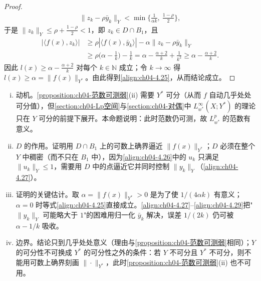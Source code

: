 \documentclass[../../main.tex]{subfiles}%
\begin{document}
\begin{proof}
\begin{align*}
\|z_k-\rho\bar y_k\|_Y<\min\Big\{\frac1{\alpha k},\ \frac{1-\rho}{2}\Big\},
\end{align*}
于是 $\|z_k\|_Y\leqslant\rho+\frac{1-\rho}{2}<1$，即 $z_k\in D\cap B_1$，且
\begin{align*}
|\langle f(x),z_k\rangle|&\geqslant\rho|\langle f(x),\bar y_k\rangle|-\alpha\|z_k-\rho\bar y_k\|_Y\\
&\geqslant\rho\Big(\alpha-\frac1k\Big)-\frac1k=\alpha-\frac{\alpha+2}{k}+\frac1{k^2}\geqslant\alpha-\frac{\alpha+2}{k}.
\end{align*}
因此 $l(x)\geqslant\alpha-\frac{\alpha+2}{k}$ 对每个 $k\in\mathbb{N}$ 成立；令 $k\to\infty$ 得 $l(x)\geqslant\alpha=\|f(x)\|_{Y^*}$。由此得到\eqref{align:ch04-4.25}，从而结论成立。
\end{proof}

\begin{remark}\label{remark:ch04-弱星范数可测动机}
\begin{enumerate}[(i)]
\item 动机。\cref{proposition:ch04-范数可测弱}(ii) 需要 $Y^*$ 可分（从而 $f$ 自动几乎处处可分值），但\cref{section:ch04-Lp空间}与\cref{section:ch04-对偶}中 $L^\infty_{w^*}(X;Y^*)$ 的理论只在 $Y$ 可分的前提下展开。本命题说明：此时范数仍可测，故 $L^p_{w^*}$ 的范数有意义。
\item $D$ 的作用。证明用 $D\cap B_1$ 上的可数上确界逼近 $\|f(x)\|_{Y^*}$；$D$ 必须在整个 $Y$ 中稠密（而不只在 $B_1$ 中），因为\eqref{align:ch04-4.26}中的 $u_k$ 只满足 $\|u_k\|_Y\leqslant1$，需要用 $D$ 中的点逼近它并同时控制 $\|y_k\|_Y$（\eqref{align:ch04-4.27}）。
\item 证明的关键估计。取 $\alpha=\|f(x)\|_{Y^*}>0$ 是为了使 $1/(4\alpha k)$ 有意义；$\alpha=0$ 时等式\eqref{align:ch04-4.25}直接成立。\eqref{align:ch04-4.27}--\eqref{align:ch04-4.29}把"$\|y_k\|_Y$ 可能略大于 $1$"的困难用归一化 $\bar y_k$ 解决，误差 $1/(2k)$ 仍可被 $\alpha-1/k$ 吸收。
\item 边界。结论只到几乎处处意义（理由与\cref{proposition:ch04-范数可测弱}相同）；$Y$ 的可分性不可换成 $Y^*$ 的可分性之外的条件：若 $Y$ 不可分且 $Y^*$ 不可分，则不能用可数上确界刻画 $\|\cdot\|_{Y^*}$，此时\cref{proposition:ch04-范数可测弱}(ii) 也不可用。
\end{enumerate}
\end{remark}
\end{document}
